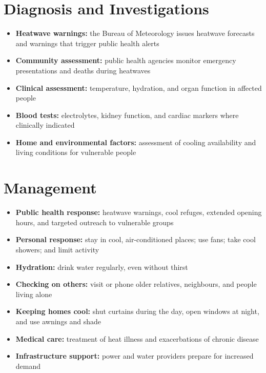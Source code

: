 \section*{Diagnosis and Investigations}
\begin{itemize}
    \item \textbf{Heatwave warnings:} the Bureau of Meteorology issues heatwave forecasts and warnings that trigger public health alerts
    \item \textbf{Community assessment:} public health agencies monitor emergency presentations and deaths during heatwaves
    \item \textbf{Clinical assessment:} temperature, hydration, and organ function in affected people
    \item \textbf{Blood tests:} electrolytes, kidney function, and cardiac markers where clinically indicated
    \item \textbf{Home and environmental factors:} assessment of cooling availability and living conditions for vulnerable people
\end{itemize}

\section*{Management}
\begin{itemize}
    \item \textbf{Public health response:} heatwave warnings, cool refuges, extended opening hours, and targeted outreach to vulnerable groups
    \item \textbf{Personal response:} stay in cool, air-conditioned places; use fans; take cool showers; and limit activity
    \item \textbf{Hydration:} drink water regularly, even without thirst
    \item \textbf{Checking on others:} visit or phone older relatives, neighbours, and people living alone
    \item \textbf{Keeping homes cool:} shut curtains during the day, open windows at night, and use awnings and shade
    \item \textbf{Medical care:} treatment of heat illness and exacerbations of chronic disease
    \item \textbf{Infrastructure support:} power and water providers prepare for increased demand
\end{itemize}

